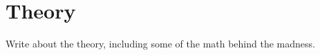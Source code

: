 \chapter{Theory}\label{cha:theory}
Write about the theory, including some of the math behind the madness.


